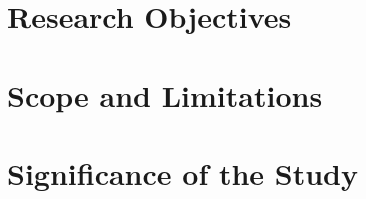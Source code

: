 \begin{comment}
\section{Significance of the Research}

This section explains why research must be done in this area.  It rationalizes the objective of the research with that of the stated problem. Avoid including sentences such as ``This research will be beneficial to the proponent/department/college'' as this is already an inherent requirement of all BS and MS thesis projects.  Focus on the research's contribution to the Computer Science field.

The following are guide questions that may help your formulate the significance of your research. 


%
%
\begin{itemize}
\item  What is the relevance and contribution of your work to the computer science community? 

\begin{itemize} 
\item How does your technical contributions or empirical findings advance the field or grow our body of knowledge? 
\item If you built a prototype of an interaction technique, interface, library, tool, or system, what is value does it add compared to existing solutions? 
\end{itemize}

\item What will be your contributions to society in general? 
    \begin{itemize}
      \item How will your main stakeholders benefit from your technical contributions or empirical findings? 
      \item What are the positive social or economic impacts? 
   \end{itemize}
\end{itemize}
\end{comment}

\begin{comment}
If applicable, describe possible commercialization and/or innovation in your research.
\end{comment}

\section{Research Objectives}

\section{Scope and Limitations}

\section{Significance of the Study}